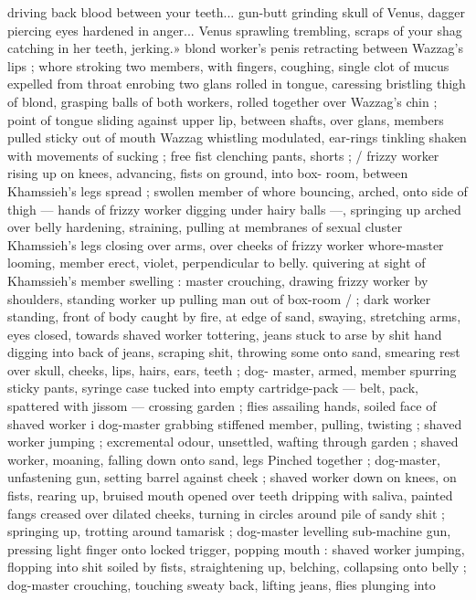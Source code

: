 driving back blood between your teeth... gun-butt grinding skull of
Venus, dagger piercing eyes hardened in anger... Venus sprawling
trembling, scraps of your shag catching in her teeth, jerking.»
blond worker's penis retracting between Wazzag's lips ; whore
stroking two members, with fingers, coughing, single clot of mucus
expelled from throat enrobing two glans rolled in tongue, caressing
bristling thigh of blond, grasping balls of both workers, rolled
together over Wazzag’s chin ; point of tongue sliding against upper
lip, between shafts, over glans, members pulled sticky out of mouth
Wazzag whistling modulated, ear-rings tinkling shaken with
movements of sucking ; free fist clenching pants, shorts ; / frizzy
worker rising up on knees, advancing, fists on ground, into box-
room, between Khamssieh's legs spread ; swollen member of whore
bouncing, arched, onto side of thigh --- hands of frizzy worker
digging under hairy balls ---, springing up arched over belly
hardening, straining, pulling at membranes of sexual cluster
Khamssieh's legs closing over arms, over cheeks of frizzy worker
whore-master looming, member erect, violet, perpendicular to belly.
quivering at sight of Khamssieh's member swelling : master
crouching, drawing frizzy worker by shoulders, standing worker up
pulling man out of box-room / ; dark worker standing, front of body
caught by fire, at edge of sand, swaying, stretching arms, eyes
closed, towards shaved worker tottering, jeans stuck to arse by shit
hand digging into back of jeans, scraping shit, throwing some onto
sand, smearing rest over skull, cheeks, lips, hairs, ears, teeth ; dog-
master, armed, member spurring sticky pants, syringe case tucked
into empty cartridge-pack --- belt, pack, spattered with jissom ---
crossing garden ; flies assailing hands, soiled face of shaved worker
i dog-master grabbing stiffened member, pulling, twisting ; shaved
worker jumping ; excremental odour, unsettled, wafting through
garden ; shaved worker, moaning, falling down onto sand, legs
Pinched together ; dog-master, unfastening gun, setting barrel
against cheek ; shaved worker down on knees, on fists, rearing up,
bruised mouth opened over teeth dripping with saliva, painted fangs
creased over dilated cheeks, turning in circles around pile of sandy
shit ; springing up, trotting around tamarisk ; dog-master levelling
sub-machine gun, pressing light finger onto locked trigger, popping
mouth : shaved worker jumping, flopping into shit soiled by fists,
straightening up, belching, collapsing onto belly ; dog-master
crouching, touching sweaty back, lifting jeans, flies plunging into
